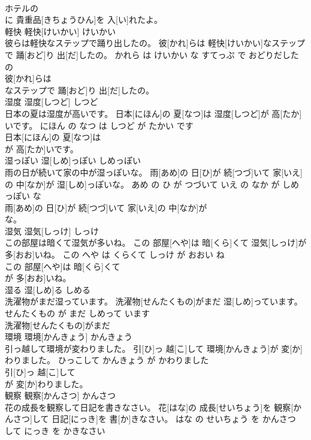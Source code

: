 \documentclass[8pt]{extreport}
\begin{document}
\begin{CJK}{UTF8}{min}
\\	ホテルの
\\	に 貴重品[きちょうひん]を 入[い]れたよ。			
\\	軽快	軽快[けいかい]	けいかい	
\\	彼らは軽快なステップで踊り出したの。	彼[かれ]らは 軽快[けいかい]なステップで 踊[おど]り 出[だ]したの。	かれら は けいかい な すてっぷ で おどりだした の	
\\	彼[かれ]らは
\\	なステップで 踊[おど]り 出[だ]したの。			
\\	湿度	湿度[しつど]	しつど	
\\	日本の夏は湿度が高いです。	日本[にほん]の 夏[なつ]は 湿度[しつど]が 高[たか]いです。	にほん の なつ は しつど が たかい です	
\\	日本[にほん]の 夏[なつ]は
\\	が 高[たか]いです。			
\\	湿っぽい	湿[しめ]っぽい	しめっぽい	
\\	雨の日が続いて家の中が湿っぽいな。	雨[あめ]の 日[ひ]が 続[つづ]いて 家[いえ]の 中[なか]が 湿[しめ]っぽいな。	あめ の ひ が つづいて いえ の なか が しめっぽい な	
\\	雨[あめ]の 日[ひ]が 続[つづ]いて 家[いえ]の 中[なか]が
\\	な。			
\\	湿気	湿気[しっけ]	しっけ	
\\	この部屋は暗くて湿気が多いね。	この 部屋[へや]は 暗[くら]くて 湿気[しっけ]が 多[おお]いね。	この へや は くらくて しっけ が おおい ね	
\\	この 部屋[へや]は 暗[くら]くて
\\	が 多[おお]いね。			
\\	湿る	湿[しめ]る	しめる	
\\	洗濯物がまだ湿っています。	洗濯物[せんたくもの]がまだ 湿[しめ]っています。	せんたくもの が まだ しめって います	
\\	洗濯物[せんたくもの]がまだ
\\	環境	環境[かんきょう]	かんきょう	
\\	引っ越して環境が変わりました。	引[ひ]っ 越[こ]して 環境[かんきょう]が 変[か]わりました。	ひっこして かんきょう が かわりました	
\\	引[ひ]っ 越[こ]して
\\	が 変[か]わりました。			
\\	観察	観察[かんさつ]	かんさつ	
\\	花の成長を観察して日記を書きなさい。	花[はな]の 成長[せいちょう]を 観察[かんさつ]して 日記[にっき]を 書[か]きなさい。	はな の せいちょう を かんさつ して にっき を かきなさい	

\end{CJK}
\end{document}
